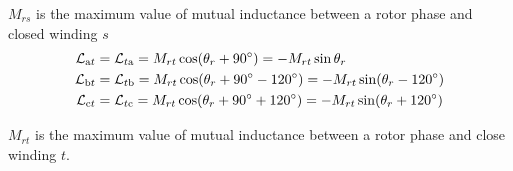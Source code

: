 \documentclass[a4paper,numbers=noenddot,12pt]{scrbook}
\begin{document}
    $M_{rs}$ is the maximum value of mutual inductance between a rotor phase and closed winding $s$
    \begin{equation}
        \begin{aligned}
            \mathcal{L}_{\textup{a}t} & = \mathcal{L}_{t\textup{a}} = M_{rt} \cos (\theta_r + 90^{\circ}) = -M_{rt} \sin \theta_r \\
            \mathcal{L}_{\textup{b}t} & = \mathcal{L}_{t\textup{b}} = M_{rt} \cos (\theta_r + 90^{\circ} - 120^{\circ}) =  -M_{rt} \sin (\theta_r - 120^{\circ}) \\
            \mathcal{L}_{\textup{c}t} & = \mathcal{L}_{t\textup{c}} = M_{rt} \cos (\theta_r + 90^{\circ} + 120^{\circ}) =  -M_{rt} \sin (\theta_r + 120^{\circ}) \\
        \end{aligned}
        \label{eq_Eq8.19}
    \end{equation}

    $M_{rt}$ is the maximum value of mutual inductance between a rotor phase and close winding $t$.
\end{document}
